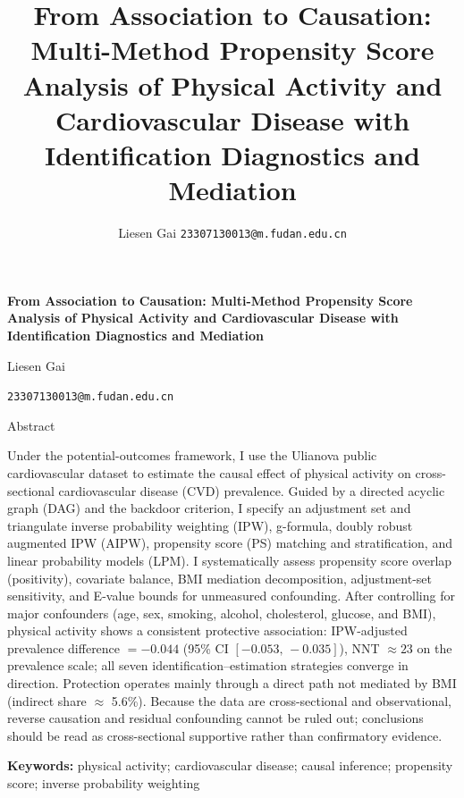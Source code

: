 \documentclass[12pt,a4paper]{article}
\title{From Association to Causation: Multi-Method Propensity Score Analysis of Physical Activity and Cardiovascular Disease with Identification Diagnostics and Mediation}
\author{Liesen Gai \texttt{23307130013@m.fudan.edu.cn}}
\renewcommand{\abstractname}{Abstract}
\renewenvironment{abstract}{%
  \centerline{\cfttoctitlefont\abstractname}\par\vspace{0.8em}%
  \list{}{%
    \setlength{\leftmargin}{0pt}%
    \setlength{\rightmargin}{0pt}}%
  \item\relax\fontsize{13pt}{15.6pt}\selectfont}
 {\endlist}
\begin{document}
\begin{titlepage}
\centering
\vspace*{2.8cm}
\begingroup
\linespread{1}\selectfont
{\LARGE\bfseries
From Association to Causation:
Multi-Method Propensity Score Analysis
of Physical Activity and Cardiovascular Disease
with Identification Diagnostics and Mediation
\par}
\endgroup
\vspace{2.8cm}
{\Large Liesen Gai\par}
\vspace{0.8cm}
{\large \texttt{23307130013@m.fudan.edu.cn}\par}
\vspace{2.2cm}
\vfill
\end{titlepage}

\newpage
\begin{abstract}
\noindent Under the potential-outcomes framework, I use the Ulianova public cardiovascular dataset to estimate the causal effect of physical activity on cross-sectional cardiovascular disease (CVD) prevalence. Guided by a directed acyclic graph (DAG) and the backdoor criterion, I specify an adjustment set and triangulate inverse probability weighting (IPW), g-formula, doubly robust augmented IPW (AIPW), propensity score (PS) matching and stratification, and linear probability models (LPM). I systematically assess propensity score overlap (positivity), covariate balance, BMI mediation decomposition, adjustment-set sensitivity, and E-value bounds for unmeasured confounding. After controlling for major confounders (age, sex, smoking, alcohol, cholesterol, glucose, and BMI), physical activity shows a consistent protective association: IPW-adjusted prevalence difference $=-0.044$ (95\% CI $[-0.053,\,-0.035]$), NNT $\approx 23$ on the prevalence scale; all seven identification--estimation strategies converge in direction. Protection operates mainly through a direct path not mediated by BMI (indirect share $\approx$ 5.6\%). Because the data are cross-sectional and observational, reverse causation and residual confounding cannot be ruled out; conclusions should be read as cross-sectional supportive rather than confirmatory evidence.

\vspace{0.6em}
\noindent\textbf{Keywords:} physical activity; cardiovascular disease; causal inference; propensity score; inverse probability weighting
\end{abstract}

\newpage
\tableofcontents
\end{document}

